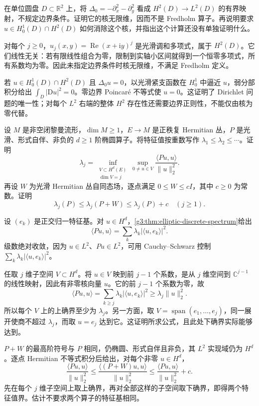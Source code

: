 \begin{exercise}\label{g3:ex:boundary-free-infinite-kernel}
	在单位圆盘 \(D\subset\mathbb R^2\) 上，将 \(\Delta_0=-\partial_x^2-\partial_y^2\) 看成 \(H^2(D)\to L^2(D)\) 的有界映射，不规定边界条件。证明它的核无限维，因而不是 Fredholm 算子。再说明要求 \(u\in H_0^1(D)\cap H^2(D)\) 如何消除这个核，并指出这个计算还没有单独证明什么。
\end{exercise}
\begin{solution}
	对每个 \(j\ge0\)，\(u_j(x,y)=\operatorname{Re}(x+\mathrm iy)^j\) 是光滑调和多项式，属于 \(H^2(D)\)。它们线性无关：若有限线性组合为零，限制到实轴小区间就得到一个恒零多项式，所有系数均为零。因此未指定边界条件时核无限维，不满足 Fredholm 定义。

	若 \(u\in H_0^1(D)\cap H^2(D)\) 且 \(\Delta_0u=0\)，以光滑紧支函数在 \(H_0^1\) 中逼近 \(u\)，弱分部积分给出 \(\int_D|\mathrm Du|^2=0\)。零边界 Poincaré 不等式使 \(u=0\)。这证明了 Dirichlet 问题的唯一性；对每个 \(L^2\) 右端的整体 \(H^2\) 存在性还需要边界正则性，不能仅由核为零代替。
\end{solution}

\begin{exercise}\label{g3:ex:elliptic-variational-eigenvalues}
	设 \(M\) 是非空闭黎曼流形，\(\dim M\ge1\)，\(E\to M\) 是正秩复 Hermitian 丛，\(P\) 是光滑、形式自伴、非负的 \(d\ge1\) 阶椭圆算子。将特征值按重数写作 \(\lambda_1\le\lambda_2\le\cdots\)。证明
	\[
		\lambda_j
		=\inf_{\substack{V\subset H^d(E)\\\dim V=j}}
		\sup_{0\ne u\in V}\frac{\langle Pu,u\rangle}{\|u\|_2^2}.
	\]
	再设 \(W\) 为光滑 Hermitian 丛自同态场，逐点满足 \(0\le W\le cI\)，其中 \(c\ge0\) 为常数。证明
	\[
		\lambda_j(P)\le\lambda_j(P+W)\le\lambda_j(P)+c
		\quad(j\ge1).
	\]
\end{exercise}
\begin{solution}
	设 \((e_k)\) 是正交归一特征基。对 \(u\in H^d\)，\cref{g3:thm:elliptic-discrete-spectrum}给出
	\[
		\langle Pu,u\rangle=\sum_k\lambda_k|\langle u,e_k\rangle|^2.
	\]
	级数绝对收敛，因为 \(u\in L^2\)、\(Pu\in L^2\)，可用 Cauchy--Schwarz 控制 \(\sum_k\lambda_k|\langle u,e_k\rangle|^2\)。

	任取 \(j\) 维子空间 \(V\subset H^d\)。将 \(u\in V\) 映到前 \(j-1\) 个系数，是从 \(j\) 维空间到 \(\mathbb C^{j-1}\) 的线性映射，因此有非零核向量 \(u\)。它的前 \(j-1\) 个系数为零，故
	\[
		\langle Pu,u\rangle
		=\sum_{k\ge j}\lambda_k|\langle u,e_k\rangle|^2
		\ge\lambda_j\|u\|_2^2.
	\]
	所以每个 \(V\) 上的上确界至少为 \(\lambda_j\)。另一方面，取 \(V=\operatorname{span}(e_1,\ldots,e_j)\)，同一展开使商不超过 \(\lambda_j\)，而取 \(u=e_j\) 达到它。这证明所求公式，且此处下确界实际能够达到。

	\(P+W\) 的最高阶符号与 \(P\) 相同，仍椭圆、形式自伴且非负，其 \(L^2\) 实现域仍为 \(H^d\)。逐点 Hermitian 不等式积分后给出，对每个非零 \(u\in H^d\)，
	\[
		\frac{\langle Pu,u\rangle}{\|u\|_2^2}
		\le\frac{\langle(P+W)u,u\rangle}{\|u\|_2^2}
		\le\frac{\langle Pu,u\rangle}{\|u\|_2^2}+c.
	\]
	先在每个 \(j\) 维子空间上取上确界，再对全部这样的子空间取下确界，即得两个特征值界。估计不要求两个算子的特征基相同。
\end{solution}

